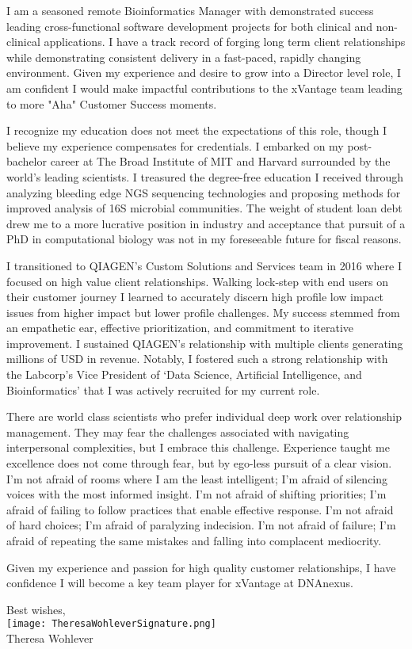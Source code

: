 \documentclass[10pt,letterpaper]{article}
\begin{document}
\begin{flushleft}
I am a seasoned remote Bioinformatics Manager with demonstrated success leading cross-functional software development projects for both clinical and non-clinical applications. I have a track record of forging long term client relationships while demonstrating consistent delivery in a fast-paced, rapidly changing environment. Given my experience and desire to grow into a Director level role, I am confident I would make impactful contributions to the xVantage team leading to more "Aha" Customer Success moments.

I recognize my education does not meet the expectations of this role, though I believe my experience compensates for credentials. I embarked on my post-bachelor career at The Broad Institute of MIT and Harvard surrounded by the world's leading scientists. I treasured the degree-free education I received through analyzing bleeding edge NGS sequencing technologies and proposing methods for improved analysis of 16S microbial communities. The weight of student loan debt drew me to a more lucrative position in industry and acceptance that pursuit of a PhD in computational biology was not in my foreseeable future for fiscal reasons.

I transitioned to QIAGEN's Custom Solutions and Services team in 2016 where I focused on high value client relationships. Walking lock-step with end users on their customer journey I learned to accurately discern high profile low impact issues from higher impact but lower profile challenges. My success stemmed from an empathetic ear, effective prioritization, and commitment to iterative improvement. I sustained QIAGEN's relationship with multiple clients generating millions of USD in revenue. Notably, I fostered such a strong relationship with the Labcorp\rq{}s Vice President of \lq{}Data Science, Artificial Intelligence, and Bioinformatics\rq{} that I was actively recruited for my current role. 
 
There are world class scientists who prefer individual deep work over relationship management. They may fear the challenges associated with navigating interpersonal complexities, but I embrace this challenge. Experience taught me excellence does not come through fear, but by ego-less pursuit of a clear vision. I\rq{}m not afraid of rooms where I am the least intelligent; I\rq{}m afraid of silencing voices with the most informed insight. I\rq{}m not afraid of shifting priorities; I\rq{}m afraid of failing to follow practices that enable effective response. I\rq{}m not afraid of hard choices; I\rq{}m afraid of paralyzing indecision. I\rq{}m not afraid of failure; I\rq{}m afraid of repeating the same mistakes and falling into complacent mediocrity.

Given my experience and passion for high quality customer relationships, I have confidence I will become a key team player for xVantage at DNAnexus.
\end{flushleft}




\hspace*{.6\linewidth} Best wishes, \\
\hspace*{.57\linewidth} \texttt{[image: TheresaWohleverSignature.png]}  {\vspace{-9pt}} \\
\hspace*{.6\linewidth}  Theresa Wohlever
\end{document}

